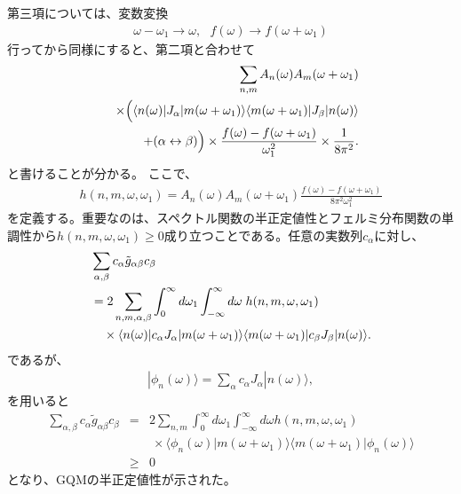 \documentclass[12pt]{jsbook}
\begin{document}
第三項については、変数変換
\begin{align}
 \omega-\omega_1 \rightarrow \omega,\ \ \  f(\omega)\rightarrow f(\omega + \omega_1)
\end{align}
行ってから同様にすると、第二項と合わせて
 \begin{eqnarray}
&&\displaystyle \sum_{n,m}A_n(\omega)A_m(\omega+\omega_1)\nonumber\\
&& \times \Bigl(\langle n(\omega)|J_\alpha|m(\omega + \omega_1)\rangle\langle m(\omega+\omega_1)|J_\beta|n(\omega)\rangle \nonumber\\
&&+ (\alpha\leftrightarrow\beta) \Bigr)\times \frac{f(\omega)-f(\omega+\omega_1)}{\omega_1^2}\times \frac{1}{8\pi^2}.
\end{eqnarray}
と書けることが分かる。
ここで、
\begin{align}
h(n,m,\omega,\omega_1) = A_n(\omega)A_m(\omega+\omega_1)\frac{f(\omega)-f(\omega+\omega_1)}{8\pi^2\omega_1^2}
\end{align}
を定義する。重要なのは、スペクトル関数の半正定値性とフェルミ分布関数の単調性から$h(n,m,\omega,\omega_1)\geq 0$成り立つことである。任意の実数列${c_\alpha}$に対し、
\begin{align}
\displaystyle &\sum_{\alpha,\beta}c_\alpha \tilde{g}_{\alpha\beta}c_{\beta}\nonumber\\
&= \displaystyle 2\sum_{n,m,\alpha,\beta}\int_{0}^{\infty}d\omega_1\int_{-\infty}^{\infty}d\omega \;h(n,m,\omega,\omega_1)\;\nonumber\\
& \ \ \ \times \langle n(\omega)|c_\alpha J_\alpha|m(\omega + \omega_1)\rangle \langle m(\omega+\omega_1)|c_\beta J_\beta|n(\omega)\rangle.
\end{align}
であるが、
\begin{align}
|\phi_n(\omega)\rangle = \displaystyle \sum_{\alpha} c_\alpha J_\alpha|n(\omega)\rangle ,
\end{align}
を用いると
\begin{eqnarray}
\displaystyle \sum_{\alpha,\beta}c_\alpha \tilde{g}_{\alpha\beta}c_{\beta}&=&\displaystyle 2\sum_{n,m} \int_{0}^{\infty}d\omega_1\int_{-\infty}^{\infty}d\omega h(n,m,\omega,\omega_1)\nonumber\\
&& \ \times \langle \phi_n(\omega)| m(\omega+\omega_1)\rangle\langle m(\omega+\omega_1)|\phi_n(\omega)\rangle \nonumber\\
&\geq& 0
\end{eqnarray}
となり、GQMの半正定値性が示された。
\end{document}
